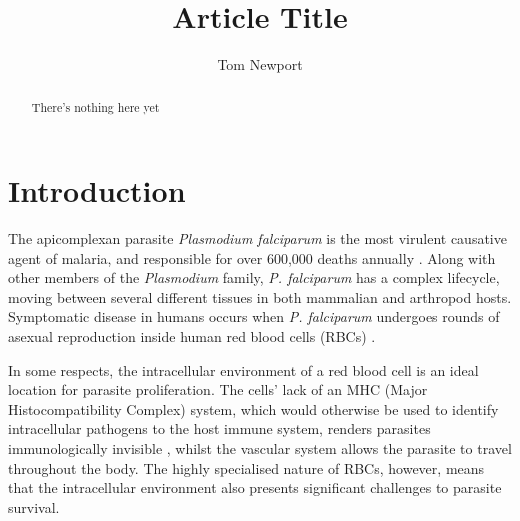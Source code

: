 \documentclass[fleqn,10pt]{article} %
\begin{document}
\title{Article Title} %

\author{Tom Newport} %
\maketitle


\begin{abstract}
There's nothing here yet
\end{abstract}

\maketitle %

\tableofcontents %

\thispagestyle{empty} %


\newcommand{\bn}
[1]{\textit{#1}}

\newcommand{\pf}
{\bn{P. falciparum }}

\newcommand{\str}
[1]{\textbf{#1}}

\section{Introduction} 

The apicomplexan parasite \bn{Plasmodium falciparum} is the most virulent causative agent of malaria, and responsible for over 600,000 deaths annually \cite{WorldHealthOrganisation2013}. Along with other members of the \bn{Plasmodium} family, \pf has a complex lifecycle, moving between several different tissues in both mammalian and arthropod hosts. Symptomatic disease in humans occurs when \pf undergoes rounds of asexual reproduction inside human red blood cells (RBCs) \cite{Chen2000}.

In some respects, the intracellular environment of a red blood cell is an ideal location for parasite proliferation. The cells' lack of an MHC (Major Histocompatibility Complex) system, which would otherwise be used to identify intracellular pathogens to the host immune system, renders parasites immunologically invisible \cite{Kirchgatter2005}, whilst the vascular system allows the parasite to travel throughout the body. The highly specialised nature of RBCs, however, means that the intracellular environment also presents significant challenges to parasite survival.
\end{document}
